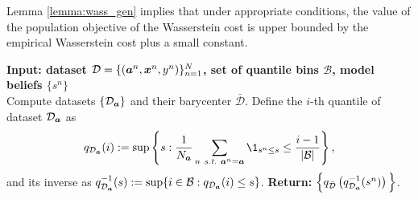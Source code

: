 \documentclass[letterpaper]{article}
\theoremstyle{definition}
\newcommand{\st}{\emph{s.t.}}
\begin{document}
Lemma \ref{lemma:wass_gen} implies that under appropriate conditions, the value of the population objective of the Wasserstein cost is upper bounded by  the empirical Wasserstein cost plus a small constant.
\begin{algorithm}[t]
\textbf{Input: dataset $\mathcal{D} = \{ ({\bm{a}}^n, {\bm{x}}^n, y^n)\}_{n=1}^N$, set of quantile bins $\mathcal{B}$, model beliefs $\{s^n\}$} \\
Compute datasets $\{\mathcal{D}_{\bm{a}}\}$ and their barycenter $\bar{\mathcal{D}}$.
\newline
Define the $i$-th quantile of dataset $\mathcal{D}_{\bm{a}}$ as
$$q_{\mathcal{D}_{\va}}(i) := \sup \left\{s : \frac{1}{N_{\va}}\sum_{n ~\st~ \va^n=\va} \1_{s^n \le s} \le \frac{i-1}{|\mathcal{B}|}\right\},$$
and its inverse as $q^{-1}_{\mathcal{D}_{{\bm{a}}}}(s) := \sup\{ i \in \mathcal{B} : q_{ \mathcal{D}_{{\bm{a}}}}(i) \le s\}$. 
\newline 
\textbf{Return:}  $\Big\{ q_{\bar{\mathcal{D}}}\left(q^{-1}_{\mathcal{D}_{{\bm{a}}}}(s^n)\right)\Big\}$.\newline 
\caption{Wass-1 Post-Processing}
\label{Alg:wass1_post_process}
\end{algorithm}
\end{document}
